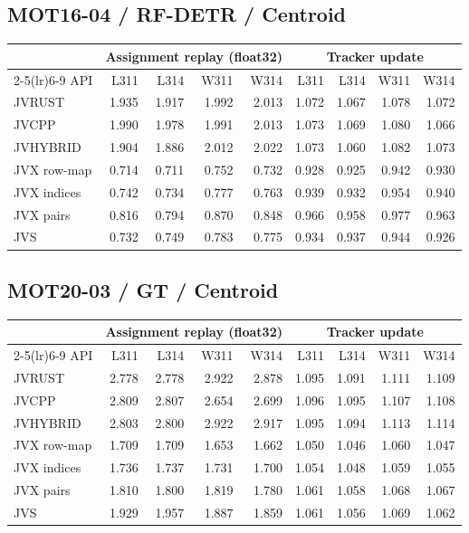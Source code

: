 \subsection*{MOT16-04 / RF-DETR / Centroid}
\begin{center}\small
\begin{tabular}{@{}lrrrrrrrr@{}}
\toprule
 & \multicolumn{4}{c}{Assignment replay (float32)} & \multicolumn{4}{c}{Tracker update} \\
\cmidrule(lr){2-5}\cmidrule(lr){6-9}
API & L311 & L314 & W311 & W314 & L311 & L314 & W311 & W314 \\
\midrule
JVRUST & 1.935 & 1.917 & 1.992 & 2.013 & 1.072 & 1.067 & 1.078 & 1.072 \\
JVCPP & 1.990 & 1.978 & 1.991 & 2.013 & 1.073 & 1.069 & 1.080 & 1.066 \\
JVHYBRID & 1.904 & 1.886 & 2.012 & 2.022 & 1.073 & 1.060 & 1.082 & 1.073 \\
JVX row-map & 0.714 & 0.711 & 0.752 & 0.732 & 0.928 & 0.925 & 0.942 & 0.930 \\
JVX indices & 0.742 & 0.734 & 0.777 & 0.763 & 0.939 & 0.932 & 0.954 & 0.940 \\
JVX pairs & 0.816 & 0.794 & 0.870 & 0.848 & 0.966 & 0.958 & 0.977 & 0.963 \\
JVS & 0.732 & 0.749 & 0.783 & 0.775 & 0.934 & 0.937 & 0.944 & 0.926 \\
\bottomrule
\end{tabular}
\end{center}
\clearpage
\subsection*{MOT20-03 / GT / Centroid}
\begin{center}\small
\begin{tabular}{@{}lrrrrrrrr@{}}
\toprule
 & \multicolumn{4}{c}{Assignment replay (float32)} & \multicolumn{4}{c}{Tracker update} \\
\cmidrule(lr){2-5}\cmidrule(lr){6-9}
API & L311 & L314 & W311 & W314 & L311 & L314 & W311 & W314 \\
\midrule
JVRUST & 2.778 & 2.778 & 2.922 & 2.878 & 1.095 & 1.091 & 1.111 & 1.109 \\
JVCPP & 2.809 & 2.807 & 2.654 & 2.699 & 1.096 & 1.095 & 1.107 & 1.108 \\
JVHYBRID & 2.803 & 2.800 & 2.922 & 2.917 & 1.095 & 1.094 & 1.113 & 1.114 \\
JVX row-map & 1.709 & 1.709 & 1.653 & 1.662 & 1.050 & 1.046 & 1.060 & 1.047 \\
JVX indices & 1.736 & 1.737 & 1.731 & 1.700 & 1.054 & 1.048 & 1.059 & 1.055 \\
JVX pairs & 1.810 & 1.800 & 1.819 & 1.780 & 1.061 & 1.058 & 1.068 & 1.067 \\
JVS & 1.929 & 1.957 & 1.887 & 1.859 & 1.061 & 1.056 & 1.069 & 1.062 \\
\bottomrule
\end{tabular}
\end{center}
